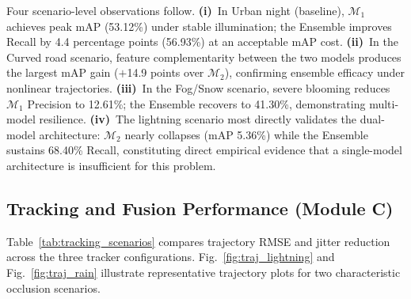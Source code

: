 \documentclass{jstarticle}
\theoremstyle{remark}
\begin{document}
Four scenario-level observations follow. \textbf{(i)}~In Urban night
(baseline), $\mathcal{M}_1$ achieves peak mAP (53.12\%) under stable
illumination; the Ensemble improves Recall by 4.4 percentage points
(56.93\%) at an acceptable mAP cost. \textbf{(ii)}~In the Curved road
scenario, feature complementarity between the two models produces the
largest mAP gain ($+$14.9 points over $\mathcal{M}_2$), confirming
ensemble efficacy under nonlinear trajectories. \textbf{(iii)}~In the
Fog/Snow scenario, severe blooming reduces $\mathcal{M}_1$ Precision
to 12.61\%; the Ensemble recovers to 41.30\%, demonstrating
multi-model resilience. \textbf{(iv)}~The lightning scenario most
directly validates the dual-model architecture: $\mathcal{M}_2$
nearly collapses (mAP 5.36\%) while the Ensemble sustains 68.40\%
Recall, constituting direct empirical evidence that a single-model
architecture is insufficient for this problem.

\subsection{Tracking and Fusion Performance (Module C)}
\label{subsec:res_kf}

Table~\ref{tab:tracking_scenarios} compares trajectory RMSE and
jitter reduction across the three tracker configurations.
Fig.~\ref{fig:traj_lightning} and Fig.~\ref{fig:traj_rain} illustrate
representative trajectory plots for two characteristic occlusion
scenarios.

\begin{table}[H]
\centering
\caption{Tracking performance across the five Golden Test scenarios}
\label{tab:tracking_scenarios}
\end{table}
\end{document}
